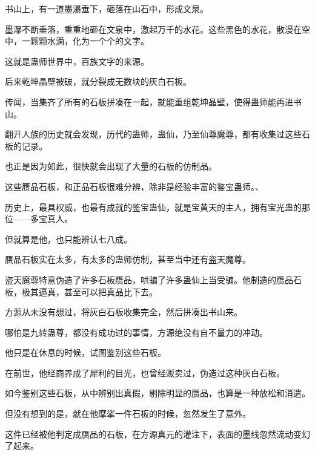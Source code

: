 \begin{this_body}
书山上，有一道墨瀑垂下，砸落在山石中，形成文泉。

墨瀑不断垂落，重重地砸在文泉中，激起万千的水花。这些黑色的水花，散漫在空中，一颗颗水滴，化为一个个的文字。

这就是蛊师世界中，百族文字的来源。

后来乾坤晶壁被破，就分裂成无数块的灰白石板。

传闻，当集齐了所有的石板拼凑在一起，就能重组乾坤晶壁，使得蛊师能再进书山。

翻开人族的历史就会发现，历代的蛊师，蛊仙，乃至仙尊魔尊，都有收集过这些石板的记录。

也正是因为如此，很快就会出现了大量的石板的仿制品。

这些赝品石板，和正品石板很难分辨，除非是经验丰富的鉴宝蛊师。、

历史上，最具权威，也最有成就的鉴宝蛊仙，就是宝黄天的主人，拥有宝光蛊的那位——多宝真人。

但就算是他，也只能辨认七八成。

赝品石板实在太多，有太多的蛊师仿制，甚至当中还有盗天魔尊。

盗天魔尊特意伪造了许多石板赝品，哄骗了许多蛊仙上当受骗。他制造的赝品石板，极其逼真，甚至可以把真品比下去。

方源从未没有想过，将灰白石板收集完全，然后拼凑出书山来。

哪怕是九转蛊尊，都没有成功过的事情，方源绝没有自不量力的冲动。

他只是在休息的时候，试图鉴别这些石板。

在前世，他经商养成了犀利的目光，也曾经贩卖过，伪造过这种灰白石板。

如今鉴别这些石板，从中辨别出真假，剔除明显的赝品，也算是一种放松和消遣。

但没有想到的是，就在他摩挲一件石板的时候，忽然发生了意外。

这件已经被他判定成赝品的石板，在方源真元的灌注下，表面的墨线忽然流动变幻了起来。

\end{this_body}

